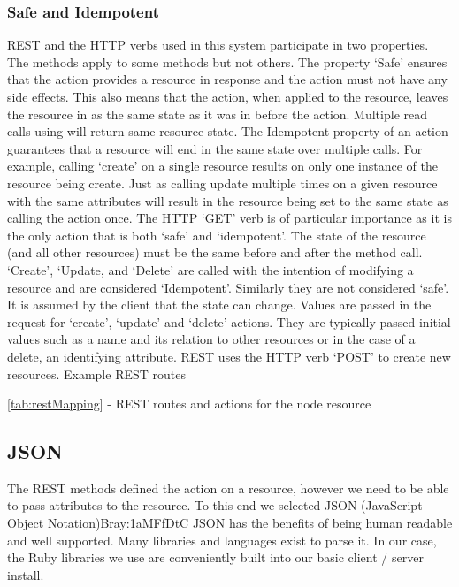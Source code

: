 \subsubsection{Safe and Idempotent}
      REST and the HTTP verbs used in this system participate in two properties. The methods apply to some methods but not others.  The property ‘Safe’ ensures that the action provides a resource in response and the action must not have any side effects. This also means that the action, when applied to the resource, leaves the resource in as the same state as it was in before the action.  Multiple read calls using will return same resource state.  
      The Idempotent property of an action guarantees that a resource will end in the same state over multiple calls. For example, calling ‘create’ on a single resource results on only one instance of the resource being create.  Just as calling update multiple times on a given resource with the same attributes will result in the resource being set to the same state as calling the action once.  The HTTP ‘GET’ verb is of particular importance as it is the only action that is both ‘safe’ and ‘idempotent’.  
      The state of the resource (and all other resources) must be the same before and after the method call.  ‘Create’, ‘Update, and ‘Delete’ are called with the intention of modifying a resource and are considered ‘Idempotent’.  Similarly they are not considered ‘safe’.  It is assumed by the client that the state can change.  
       Values are passed in the request for ‘create’, ‘update’ and ‘delete’ actions.  They are typically passed initial values such as a name and its relation to other resources or in the case of a delete, an identifying attribute.  REST uses the HTTP verb ‘POST’ to create new resources.  
       Example REST routes
        
        \autoref{tab:restMapping} - REST routes and actions for the node resource
\subsection{JSON}
        The REST methods defined the action on a resource, however we need to be able to pass attributes to the resource. To this end we selected JSON (JavaScript Object Notation){Bray:1aMFfDtC} JSON has the benefits of being human readable and well supported. Many libraries and languages exist to parse it. In our case, the Ruby libraries we use are conveniently built into our basic client / server install.  





